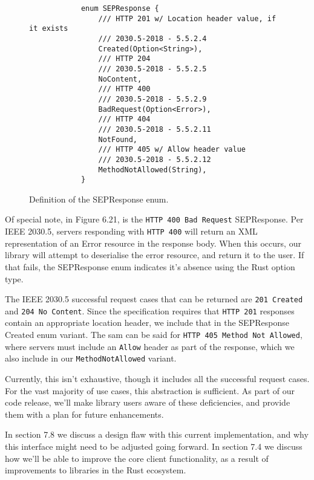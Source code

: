 \begin{figure}[h]
    \begin{center}
        \begin{lstlisting}
            enum SEPResponse {
                /// HTTP 201 w/ Location header value, if it exists
                /// 2030.5-2018 - 5.5.2.4
                Created(Option<String>),
                /// HTTP 204
                /// 2030.5-2018 - 5.5.2.5
                NoContent,
                /// HTTP 400 
                /// 2030.5-2018 - 5.5.2.9
                BadRequest(Option<Error>),
                /// HTTP 404 
                /// 2030.5-2018 - 5.5.2.11
                NotFound,
                /// HTTP 405 w/ Allow header value 
                /// 2030.5-2018 - 5.5.2.12
                MethodNotAllowed(String),
            }
        \end{lstlisting}
        \label{fig:sepresponse}
        \vspace{-10pt}
        \caption{Definition of the SEPResponse enum.}
    \end{center}
\end{figure}

Of special note, in Figure 6.21, is the \texttt{HTTP 400 Bad Request} SEPResponse. Per IEEE 2030.5, servers responding with \texttt{HTTP 400} will return an XML representation of an Error resource in the response body. When this occurs, our library will attempt to deserialise the error resource, and return it to the user. If that fails, the SEPResponse enum indicates it's absence using the Rust option type.

The IEEE 2030.5 successful request cases that can be returned are \texttt{201 Created} and \texttt{204 No Content}. Since the specification requires that \texttt{HTTP 201} responses contain an appropriate location header, we include that in the SEPResponse Created enum variant. The sam can be said for \texttt{HTTP 405 Method Not Allowed}, where servers must include an \texttt{Allow} header as part of the response, which we also include in our \texttt{MethodNotAllowed} variant.

Currently, this isn't exhaustive, though it includes all the successful request cases. For the vast majority of use cases, this abstraction is sufficient. As part of our code release, we'll make library users aware of these deficiencies, and provide them with a plan for future enhancements.

In section 7.8 we discuss a design flaw with this current implementation, and why this interface might need to be adjusted going forward. In section 7.4 we discuss how we'll be able to improve the core client functionality, as a result of improvements to libraries in the Rust ecosystem.


